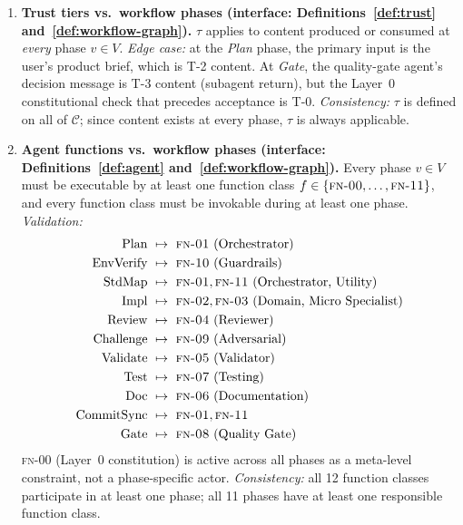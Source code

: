 \documentclass[12pt]{article}
\theoremstyle{definition}
\newcommand{\FN}[1]{\textsc{fn-#1}}
\begin{document}
\begin{enumerate}[label=\textbf{X\arabic*.}, leftmargin=*, widest=X9]
  \item \textbf{Trust tiers vs.\ workflow phases (interface:
        Definitions~\ref{def:trust}
        and~\ref{def:workflow-graph}).}
        $\tau$ applies to content produced or consumed at
        \emph{every} phase $v \in V$.
        \emph{Edge case:} at the \textit{Plan} phase, the primary
        input is the user's product brief, which is T-2 content.
        At \textit{Gate}, the quality-gate agent's decision message
        is T-3 content (subagent return), but the Layer~0
        constitutional check that precedes acceptance is T-0.
        \emph{Consistency:} $\tau$ is defined on all of
        $\mathcal{C}$; since content exists at every phase,
        $\tau$ is always applicable.

  \item \textbf{Agent functions vs.\ workflow phases (interface:
        Definitions~\ref{def:agent}
        and~\ref{def:workflow-graph}).}
        Every phase $v \in V$ must be executable by at least one
        function class $f \in \{\FN{00},\ldots,\FN{11}\}$, and
        every function class must be invokable during at least one
        phase.
        \emph{Validation:}
        \begin{align*}
          \mathrm{Plan}\ &\mapsto\ \FN{01}\ \text{(Orchestrator)} \\
          \mathrm{EnvVerify}\ &\mapsto\ \FN{10}\ \text{(Guardrails)} \\
          \mathrm{StdMap}\ &\mapsto\ \FN{01}, \FN{11}
            \ \text{(Orchestrator, Utility)} \\
          \mathrm{Impl}\ &\mapsto\ \FN{02}, \FN{03}
            \ \text{(Domain, Micro Specialist)} \\
          \mathrm{Review}\ &\mapsto\ \FN{04}\ \text{(Reviewer)} \\
          \mathrm{Challenge}\ &\mapsto\ \FN{09}
            \ \text{(Adversarial)} \\
          \mathrm{Validate}\ &\mapsto\ \FN{05}
            \ \text{(Validator)} \\
          \mathrm{Test}\ &\mapsto\ \FN{07}\ \text{(Testing)} \\
          \mathrm{Doc}\ &\mapsto\ \FN{06}
            \ \text{(Documentation)} \\
          \mathrm{CommitSync}\ &\mapsto\ \FN{01}, \FN{11} \\
          \mathrm{Gate}\ &\mapsto\ \FN{08}
            \ \text{(Quality Gate)}
        \end{align*}
        \FN{00} (Layer~0 constitution) is active across all phases
        as a meta-level constraint, not a phase-specific actor.
        \emph{Consistency:} all 12 function classes participate in
        at least one phase; all 11 phases have at least one
        responsible function class.


\end{enumerate}
\end{document}
